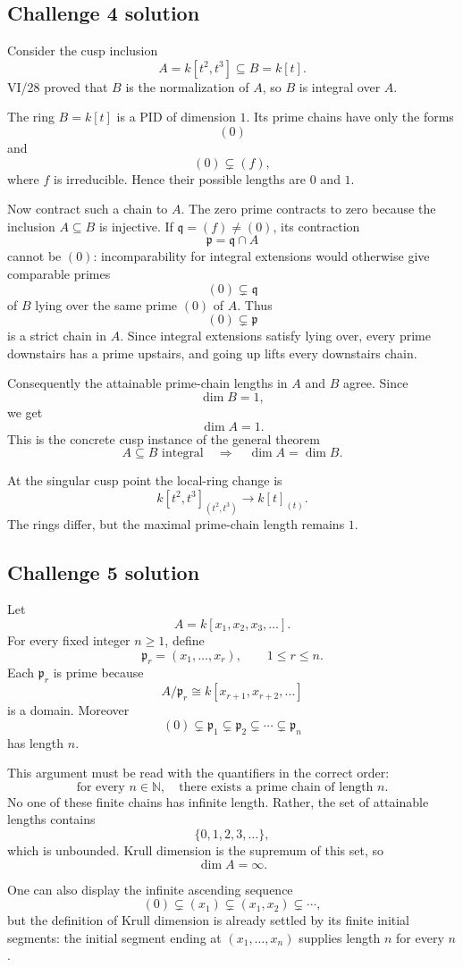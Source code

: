 \subsection*{Challenge 4 solution}
\begin{solution}
Consider the cusp inclusion
\[
A=k[t^2,t^3]\subseteq B=k[t].
\]
VI/28 proved that \(B\) is the normalization of \(A\), so \(B\) is integral over \(A\).

The ring \(B=k[t]\) is a PID of dimension \(1\).  Its prime chains have only the forms
\[
(0)
\]
and
\[
(0)\subsetneq(f),
\]
where \(f\) is irreducible.  Hence their possible lengths are \(0\) and \(1\).

Now contract such a chain to \(A\).  The zero prime contracts to zero because the inclusion
\(A\subseteq B\) is injective.  If \(\mathfrak q=(f)\ne(0)\), its contraction
\[
\mathfrak p=\mathfrak q\cap A
\]
cannot be \((0)\): incomparability for integral extensions would otherwise give comparable primes
\[
(0)\subsetneq\mathfrak q
\]
of \(B\) lying over the same prime \((0)\) of \(A\).  Thus
\[
(0)\subsetneq\mathfrak p
\]
is a strict chain in \(A\).  Since integral extensions satisfy lying over, every prime downstairs
has a prime upstairs, and going up lifts every downstairs chain.

Consequently the attainable prime-chain lengths in \(A\) and \(B\) agree.  Since
\[
\dim B=1,
\]
we get
\[
\boxed{\dim A=1}.
\]
This is the concrete cusp instance of the general theorem
\[
A\subseteq B\text{ integral}
\quad\Longrightarrow\quad
\dim A=\dim B.
\]

At the singular cusp point the local-ring change is
\[
k[t^2,t^3]_{(t^2,t^3)}
\longrightarrow
k[t]_{(t)}.
\]
The rings differ, but the maximal prime-chain length remains \(1\).
\end{solution}

\subsection*{Challenge 5 solution}
\begin{solution}
Let
\[
A=k[x_1,x_2,x_3,\ldots].
\]
For every fixed integer \(n\ge1\), define
\[
\mathfrak p_r=(x_1,\ldots,x_r),
\qquad
1\le r\le n.
\]
Each \(\mathfrak p_r\) is prime because
\[
A/\mathfrak p_r
\cong
k[x_{r+1},x_{r+2},\ldots]
\]
is a domain.  Moreover
\[
(0)\subsetneq
\mathfrak p_1\subsetneq
\mathfrak p_2\subsetneq\cdots\subsetneq
\mathfrak p_n
\]
has length \(n\).

This argument must be read with the quantifiers in the correct order:
\[
\text{for every }n\in\mathbb N,
\quad
\text{there exists a prime chain of length }n.
\]
No one of these finite chains has infinite length.  Rather, the set of attainable lengths contains
\[
\{0,1,2,3,\ldots\},
\]
which is unbounded.  Krull dimension is the supremum of this set, so
\[
\boxed{\dim A=\infty}.
\]

One can also display the infinite ascending sequence
\[
(0)\subsetneq(x_1)\subsetneq(x_1,x_2)\subsetneq\cdots,
\]
but the definition of Krull dimension is already settled by its finite initial segments: the
initial segment ending at \((x_1,\ldots,x_n)\) supplies length \(n\) for every \(n\).
\end{solution}
